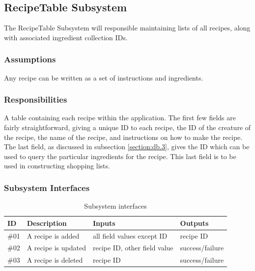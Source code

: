 \subsection{RecipeTable Subsystem}\label{section:db.4}
The RecipeTable Subsystem will responsible maintaining lists of all recipes, along with associated ingredient collection IDs.


\subsubsection{Assumptions}
Any recipe can be written as a set of instructions and ingredients.

\subsubsection{Responsibilities}
A table containing each recipe within the application.  The first few fields are fairly straightforward, giving a unique ID to each recipe, the ID of the creature of the recipe, the name of the recipe, and instructions on how to make the recipe.  The last field, as discussed in subsection \ref{section:db.3}, gives the ID which can be used to query the particular ingredients for the recipe.  This last field is to be used in constructing shopping lists.


\subsubsection{Subsystem Interfaces}
\begin {table}[H]
\caption {Subsystem interfaces} 
\begin{center}
    \begin{tabular}{ | p{1cm} | p{6cm} | p{3cm} | p{3cm} |}
    \hline
    ID & Description & Inputs & Outputs \\ \hline
    \#01 & A recipe is added & all field values except ID & recipe ID  \\ \hline
    \#02 & A recipe is updated & recipe ID, other field value & success/failure  \\ \hline
    \#03 & A recipe is deleted & recipe ID & success/failure  \\ \hline
    \end{tabular}
\end{center}
\end{table}